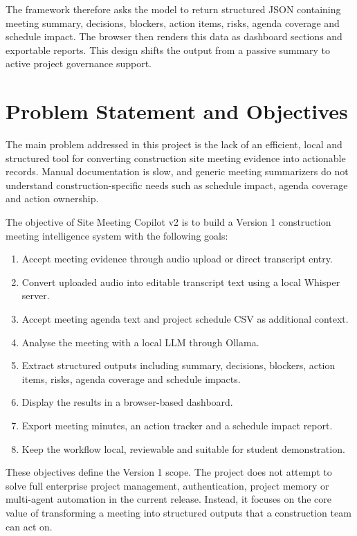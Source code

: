 \documentclass[11pt,a4paper]{article}
\begin{document}
The framework therefore asks the model to return structured JSON containing meeting summary, decisions, blockers, action items, risks, agenda coverage and schedule impact. The browser then renders this data as dashboard sections and exportable reports. This design shifts the output from a passive summary to active project governance support.

\section{Problem Statement and Objectives}

The main problem addressed in this project is the lack of an efficient, local and structured tool for converting construction site meeting evidence into actionable records. Manual documentation is slow, and generic meeting summarizers do not understand construction-specific needs such as schedule impact, agenda coverage and action ownership.

The objective of Site Meeting Copilot v2 is to build a Version 1 construction meeting intelligence system with the following goals:

\begin{enumerate}[leftmargin=0.6cm]
    \item Accept meeting evidence through audio upload or direct transcript entry.
    \item Convert uploaded audio into editable transcript text using a local Whisper server.
    \item Accept meeting agenda text and project schedule CSV as additional context.
    \item Analyse the meeting with a local LLM through Ollama.
    \item Extract structured outputs including summary, decisions, blockers, action items, risks, agenda coverage and schedule impacts.
    \item Display the results in a browser-based dashboard.
    \item Export meeting minutes, an action tracker and a schedule impact report.
    \item Keep the workflow local, reviewable and suitable for student demonstration.
\end{enumerate}

These objectives define the Version 1 scope. The project does not attempt to solve full enterprise project management, authentication, project memory or multi-agent automation in the current release. Instead, it focuses on the core value of transforming a meeting into structured outputs that a construction team can act on.
\end{document}
